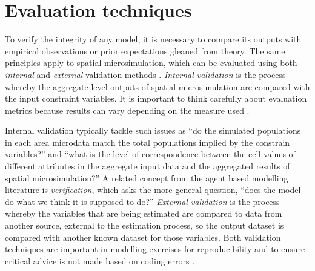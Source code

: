 \documentclass[a4paper,10pt]{article}
\begin{document}


\section{Evaluation techniques}
To verify the integrity of any model, it is necessary to compare its outputs
with empirical observations or prior expectations gleaned from theory.
The same principles apply to spatial microsimulation, which can be evaluated using
both \emph{internal} and \emph{external} validation methods \citep{Edwards2009}.
\emph{Internal validation} is the process whereby
the aggregate-level outputs of spatial microsimulation are compared with
the input constraint variables. It is important to think carefully about
evaluation metrics because results can vary depending on the measure used
\citep{Voas2001}.

Internal validation typically tackle such issues
as ``do the simulated populations in each area
microdata match the total populations implied by the constrain variables?''
and ``what is the level of correspondence between the cell values of different
attributes in the aggregate input data and the aggregated results of spatial microsimulation?''
A related concept from the agent based modelling literature is
\emph{verification}, which asks the more general question,
``does the model
do what we think it is supposed to do?'' \citep[p.~131]{ormerod2009validation} 
\emph{External validation} is the process whereby the variables that are
being estimated are compared to data from another source,
external to the estimation process, so the output dataset is compared with
another known dataset for those variables.
Both validation techniques are important in modelling exercises for reproducibility and to ensure critical advice is not made
based on coding errors \citep{ormerod2009validation}.
\end{document}
